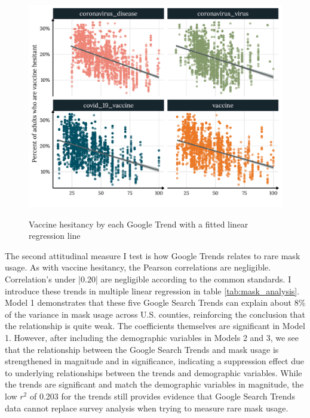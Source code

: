 
\begin{figure}[h]
{\centering \includegraphics[width=0.8\linewidth]{figs/paper1/vacc_hes_plot-1.pdf}}
\caption{Vaccine hesitancy by each Google Trend with a fitted linear regression line}\label{fig:vacc_hes_plot}
\end{figure}


The second attitudinal measure I test is how Google Trends relates to rare mask
usage. As with vaccine hesitancy, the Pearson correlations are negligible.
Correlation's under |0.20| are negligible according to the
common standards. I introduce these trends in multiple linear regression in
table \ref{tab:mask_analysis}. Model 1 demonstrates that these five Google
Search Trends can explain about 8\% of the variance in mask usage across U.S.
counties, reinforcing the conclusion that the relationship is quite weak. The
coefficients themselves are significant in Model 1. However, after
including the demographic variables in Models 2 and 3, we see that the
relationship between the Google Search Trends and mask usage is strengthened in
magnitude and in significance, indicating a suppression effect due to
underlying relationships between the trends and demographic variables. While the
trends are significant and match the demographic variables in magnitude, the
low $r^2$ of 0.203 for the trends still provides evidence that Google Search
Trends data cannot replace survey analysis when trying to measure rare mask
usage.

